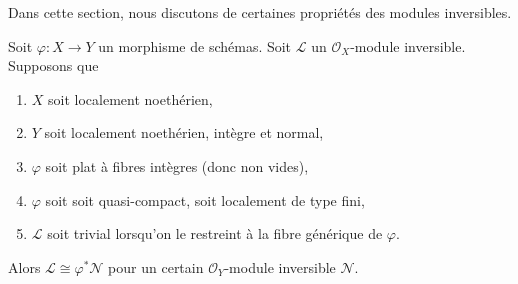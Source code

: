 \noindent
Dans cette section, nous discutons de certaines propriétés des modules
inversibles.

\begin{lemma}
\label{lemma-in-image-pullback}
Soit  $\varphi : X \to Y$  un morphisme de schémas. Soit  $\mathcal{L}$  un
 $\mathcal{O}_X$-module inversible. Supposons que
\begin{enumerate}
\item $X$  soit localement noethérien,
\item $Y$  soit localement noethérien, intègre et normal,
\item $\varphi$  soit plat à fibres intègres (donc non vides),
\item $\varphi$  soit soit quasi-compact, soit localement de type fini,
\item $\mathcal{L}$  soit trivial lorsqu'on le restreint à la fibre générique de
 $\varphi$.
\end{enumerate}
Alors  $\mathcal{L} \cong \varphi^*\mathcal{N}$  pour un certain  $\mathcal{O}_Y$-module inversible  $\mathcal{N}$.
\end{lemma}

